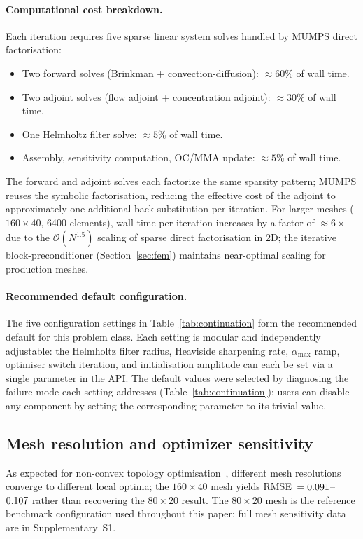 \paragraph{Computational cost breakdown.}
Each iteration requires five sparse linear system solves handled by
MUMPS direct factorisation:
\begin{itemize}\itemsep1pt
    \item Two forward solves (Brinkman + convection-diffusion):
          $\approx60\%$ of wall time.
    \item Two adjoint solves (flow adjoint + concentration adjoint):
          $\approx30\%$ of wall time.
    \item One Helmholtz filter solve: $\approx5\%$ of wall time.
    \item Assembly, sensitivity computation, OC/MMA update:
          $\approx5\%$ of wall time.
\end{itemize}
The forward and adjoint solves each factorize the same sparsity
pattern; MUMPS reuses the symbolic factorisation, reducing
the effective cost of the adjoint to approximately one
additional back-substitution per iteration.
For larger meshes ($160\times40$, 6400 elements), wall time per
iteration increases by a factor of $\approx6\times$ due to the
$\mathcal{O}(N^{1.5})$ scaling of sparse direct factorisation
in 2D; the iterative block-preconditioner (Section~\ref{sec:fem})
maintains near-optimal scaling for production meshes.

\paragraph{Recommended default configuration.}
The five configuration settings in Table~\ref{tab:continuation}
form the recommended default for this problem class.
Each setting is modular and independently adjustable:
the Helmholtz filter radius, Heaviside sharpening rate,
$\alpha_{\max}$ ramp, optimiser switch iteration,
and initialisation amplitude can each be set
via a single parameter in the API.
The default values were selected by diagnosing the failure mode
each setting addresses (Table~\ref{tab:continuation});
users can disable any component by setting the corresponding
parameter to its trivial value.

\subsection{Mesh resolution and optimizer sensitivity}
\label{sec:mesh_limitation}
As expected for non-convex topology optimisation~\cite{lazarov2016},
different mesh resolutions converge to different local optima;
the $160\times40$ mesh yields RMSE~$=0.091$--$0.107$
rather than recovering the $80\times20$ result.
The $80\times20$ mesh is the reference benchmark configuration used throughout this paper;
full mesh sensitivity data are in Supplementary~S1.

